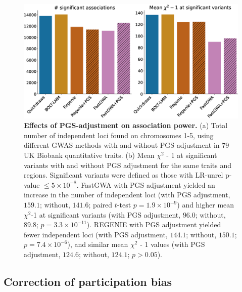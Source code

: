 \begin{figure}[h]
    \centering
    \includegraphics[width=\textwidth]{figures/fig.prs_adjustment.summary.total_loci_noCI.eps}
    \caption{\textbf{Effects of PGS-adjustment on association power.}
    (a) Total number of independent loci found on chromosomes 1-5, using different GWAS methods with and without PGS adjustment in $79$ UK Biobank quantitative traits.
    (b) Mean $\chi^2$ - 1 at significant variants with and without PGS adjustment for the same traits and regions.
    Significant variants were defined as those with LR-unrel p-value $\leq 5 \times 10^{-8}$.
    FastGWA with PGS adjustment yielded an increase in the number of independent loci (with PGS adjustment, $159.1$; without, $141.6$; paired $t$-test $p=1.9\times 10^{-9}$) and higher mean $\chi^2$-1 at significant variants (with PGS adjustment, $96.0$; without, $89.8$; $p=3.3\times 10^{-11}$).
    REGENIE with PGS adjustment yielded fewer independent loci (with PGS adjustment, $144.1$; without, $150.1$; $p=7.4\times 10^{-6}$), and similar mean $\chi^2$ - 1 values (with PGS adjustment, $124.6$; without, $124.1$; $p>0.05$).
    }
    \label{fig:prs_adjustment}
\end{figure}

\clearpage

\subsection{Correction of participation bias}
\label{sec:ch5-ukb-parti-bias}

